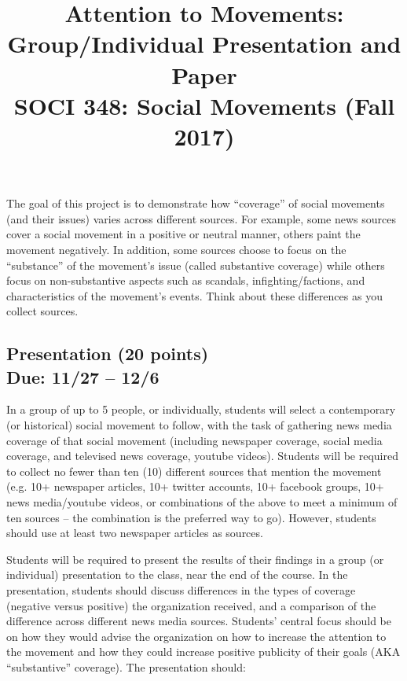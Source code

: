 \documentclass{article}
\begin{document}
\title{Attention to Movements: Group/Individual Presentation and Paper\\ SOCI 348: Social Movements (Fall 2017)}
\author[*]{}
\date{}
\maketitle

The goal of this project is to demonstrate how ``coverage'' of social movements (and their issues) varies across different sources. For example, some news sources cover a social movement in a positive or neutral manner, others paint the movement negatively. In addition, some sources choose to focus on the ``substance'' of the movement's issue (called substantive coverage) while others focus on non-substantive aspects such as scandals, infighting/factions, and characteristics of the movement's events. Think about these differences as you collect sources. \newline

\begin{centering}
\section*{Presentation (20 points)\\Due: 11/27 -- 12/6}
\end{centering}

In a group of up to 5 people, or individually, students will select a contemporary (or historical) social movement to follow, with the task of gathering news media coverage of that social movement (including newspaper coverage, social media coverage, and televised news coverage, youtube videos). Students will be required to collect no fewer than ten (10) different sources that mention the movement (e.g. 10+ newspaper articles, 10+ twitter accounts, 10+ facebook groups, 10+ news media/youtube videos, or combinations of the above to meet a minimum of ten sources -- the combination is the preferred way to go). However, students should use at least two newspaper articles as sources. \newline

Students will be required to present the results of their findings in a group (or individual) presentation to the class, near the end of the course. In the presentation, students should discuss differences in the types of coverage (negative versus positive) the organization received, and a comparison of the difference across different news media sources. Students' central focus should be on how they would advise the organization on how to increase the attention to the movement and how they could increase positive publicity of their goals (AKA ``substantive'' coverage). The presentation should: \\
\end{document}
